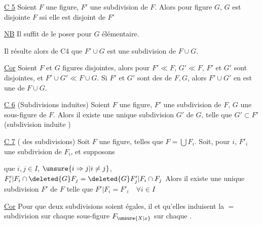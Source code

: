 
 


\uline{C 5} Soient $F$ une figure, $F'$ une subdivision de $F$. Alors pour  figure $G$, $G$ est disjointe  $F$ ssi elle est disjoint de $F'$

\uline{NB} Il suffit de le poser pour $G$ élémentaire.

Il résulte alors de  C4 que $F'\cup G$ est une subdivision de $F\cup G$.

\uline{Cor} Soient $F$ et $G$ figures disjointes, alors pour $F'\ll F$, $G'\ll F$, $F'$ et $G'$ sont disjointes, et $F'\cup G'\ll F\cup G$. Si $F'$ et $G'$ sont des  de $F,G$, alors $F'\cup G'$ en est une de $F\cup G$.

\uline{C 6} (Subdivisions induites) Soient $F$ une figure, $F'$ une subdivision de $F$, $G$ une sous-figure de $F$. Alors il existe une unique subdivision $G'$ de $G$, telle que $G'\subset F'$ (subdivision induite )


\uline{C 7} ( des subdivisions) Soit $F$ une figure,    telles que $F=\bigcup F_i$. Soit, pour  $i$, $F'_i$ une subdivision de $F_i$, et supposons


que  $i,j\in I$, $\unsure{i\Rightarrow j|i\ne j}$, $F'_i|F_i\cap\deleted{G}F_j=\deleted{G}F'_j|F_i\cap F_j$ Alors il existe une unique subdivision $F'$ de $F$ telle que $F'|F_i=F'_i\quad\forall i\in I$

\uline{Cor} Pour que deux subdivisions  soient égales, il  et  qu'elles induisent la $=$ subdivision sur chaque sous-figure  $F_{\unsure{X|x}}$  sur chaque .

